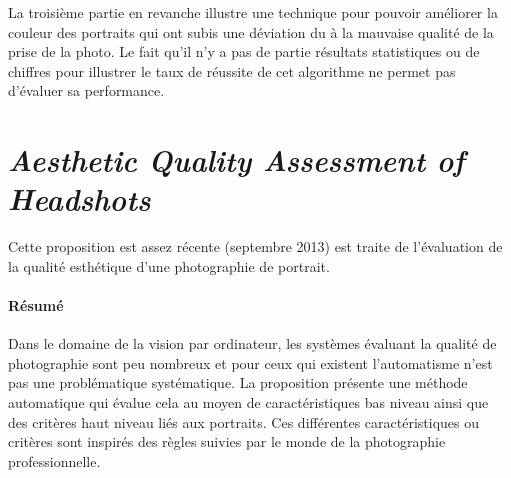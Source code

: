 \documentclass[11pt, french]{report-rd-info}
\begin{document}
La troisième partie en revanche illustre une technique pour pouvoir améliorer la couleur des portraits qui ont subis une déviation du à la mauvaise qualité de la prise de la photo.
Le fait qu'il n'y a pas de partie résultats statistiques ou de chiffres pour illustrer le taux de réussite de cet algorithme ne permet pas d'évaluer sa performance.

\section{\emph{Aesthetic Quality Assessment of Headshots}}
Cette proposition \cite{Males2013} est assez récente (septembre 2013) est traite de l’évaluation de la qualité esthétique d’une photographie de portrait.

\paragraph{Résumé}
Dans le domaine de la vision par ordinateur, les systèmes évaluant la qualité de photographie sont peu nombreux et pour ceux qui existent l’automatisme n’est pas une problématique systématique. La proposition présente une méthode automatique qui évalue cela au moyen de caractéristiques bas niveau ainsi que des critères haut niveau liés aux portraits. Ces différentes caractéristiques ou critères sont inspirés des règles suivies par le monde de la photographie professionnelle.
\end{document}
